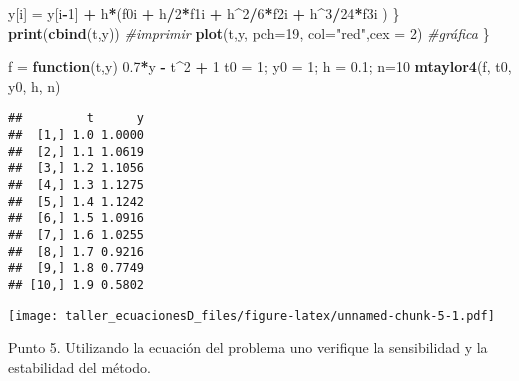\documentclass[]{article}
\newenvironment{Shaded}{\begin{snugshade}}{\end{snugshade}}
\newcommand{\KeywordTok}[1]{\textcolor[rgb]{0.13,0.29,0.53}{\textbf{#1}}}
\newcommand{\DataTypeTok}[1]{\textcolor[rgb]{0.13,0.29,0.53}{#1}}
\newcommand{\DecValTok}[1]{\textcolor[rgb]{0.00,0.00,0.81}{#1}}
\newcommand{\FloatTok}[1]{\textcolor[rgb]{0.00,0.00,0.81}{#1}}
\newcommand{\StringTok}[1]{\textcolor[rgb]{0.31,0.60,0.02}{#1}}
\newcommand{\CommentTok}[1]{\textcolor[rgb]{0.56,0.35,0.01}{\textit{#1}}}
\newcommand{\ControlFlowTok}[1]{\textcolor[rgb]{0.13,0.29,0.53}{\textbf{#1}}}
\newcommand{\OperatorTok}[1]{\textcolor[rgb]{0.81,0.36,0.00}{\textbf{#1}}}
\newcommand{\NormalTok}[1]{#1}
\begin{document}
\begin{Shaded}
\begin{Highlighting}[]
\NormalTok{     y[i] =}\StringTok{ }\NormalTok{y[i}\OperatorTok{-}\DecValTok{1}\NormalTok{] }\OperatorTok{+}\StringTok{ }\NormalTok{h}\OperatorTok{*}\NormalTok{(f0i }\OperatorTok{+}\StringTok{ }\NormalTok{h}\OperatorTok{/}\DecValTok{2}\OperatorTok{*}\NormalTok{f1i }\OperatorTok{+}\StringTok{ }\NormalTok{h}\OperatorTok{^}\DecValTok{2}\OperatorTok{/}\DecValTok{6}\OperatorTok{*}\NormalTok{f2i }\OperatorTok{+}\StringTok{ }\NormalTok{h}\OperatorTok{^}\DecValTok{3}\OperatorTok{/}\DecValTok{24}\OperatorTok{*}\NormalTok{f3i )}
\NormalTok{  \}}
  \KeywordTok{print}\NormalTok{(}\KeywordTok{cbind}\NormalTok{(t,y))                   }\CommentTok{#imprimir}
  \KeywordTok{plot}\NormalTok{(t,y, }\DataTypeTok{pch=}\DecValTok{19}\NormalTok{, }\DataTypeTok{col=}\StringTok{"red"}\NormalTok{,}\DataTypeTok{cex =} \DecValTok{2}\NormalTok{) }\CommentTok{#gráfica}
\NormalTok{\}}

\NormalTok{f =}\StringTok{ }\ControlFlowTok{function}\NormalTok{(t,y)  }\FloatTok{0.7}\OperatorTok{*}\NormalTok{y }\OperatorTok{-}\StringTok{ }\NormalTok{t}\OperatorTok{^}\DecValTok{2} \OperatorTok{+}\StringTok{ }\DecValTok{1}
\NormalTok{ t0 =}\StringTok{ }\DecValTok{1}\NormalTok{; y0 =}\StringTok{ }\DecValTok{1}\NormalTok{; h =}\StringTok{ }\FloatTok{0.1}\NormalTok{; n=}\DecValTok{10}
 \KeywordTok{mtaylor4}\NormalTok{(f, t0, y0, h, n)}
\end{Highlighting}
\end{Shaded}

\begin{verbatim}
##         t      y
##  [1,] 1.0 1.0000
##  [2,] 1.1 1.0619
##  [3,] 1.2 1.1056
##  [4,] 1.3 1.1275
##  [5,] 1.4 1.1242
##  [6,] 1.5 1.0916
##  [7,] 1.6 1.0255
##  [8,] 1.7 0.9216
##  [9,] 1.8 0.7749
## [10,] 1.9 0.5802
\end{verbatim}

\texttt{[image: taller\_ecuacionesD\_files/figure-latex/unnamed-chunk-5-1.pdf]}

Punto 5. Utilizando la ecuación del problema uno verifique la
sensibilidad y la estabilidad del método.
\end{document}
